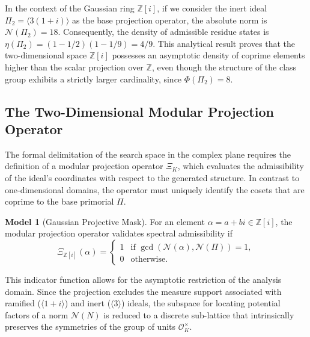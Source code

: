 \documentclass{article}
\numberwithin{equation}{section}
\theoremstyle{plain}
\theoremstyle{definition}
\newtheorem{model}[theorem]{Model}
\begin{document}
In the context of the Gaussian ring $\mathbb{Z}[i]$, if we consider the inert ideal $\Pi_2 = \langle 3(1+i) \rangle$ as the base projection operator, the absolute norm is $\mathcal{N}(\Pi_2) = 18$. Consequently, the density of admissible residue states is $\eta(\Pi_2) = (1 - 1/2)(1 - 1/9) = 4/9$. This analytical result proves that the two-dimensional space $\mathbb{Z}[i]$ possesses an asymptotic density of coprime elements higher than the scalar projection over $\mathbb{Z}$, even though the structure of the class group exhibits a strictly larger cardinality, since $\Phi(\Pi_2) = 8$.

\subsection{The Two-Dimensional Modular Projection Operator}

The formal delimitation of the search space in the complex plane requires the definition of a modular projection operator $\Xi_K$, which evaluates the admissibility of the ideal's coordinates with respect to the generated structure. In contrast to one-dimensional domains, the operator must uniquely identify the cosets that are coprime to the base primorial $\Pi$.

\begin{model}[Gaussian Projective Mask]
For an element $\alpha = a + bi \in \mathbb{Z}[i]$, the modular projection operator validates spectral admissibility if
\begin{equation}
    \Xi_{\mathbb{Z}[i]}(\alpha) = 
    \begin{cases} 
    1 & \text{if } \gcd(\mathcal{N}(\alpha), \mathcal{N}(\Pi)) = 1, \\
    0 & \text{otherwise.}
    \end{cases}
\end{equation}
\end{model}

This indicator function allows for the asymptotic restriction of the analysis domain. Since the projection excludes the measure support associated with ramified ($\langle 1+i \rangle$) and inert ($\langle 3 \rangle$) ideals, the subspace for locating potential factors of a norm $\mathcal{N}(N)$ is reduced to a discrete sub-lattice that intrinsically preserves the symmetries of the group of units $\mathcal{O}_K^\times$.

\end{document}
